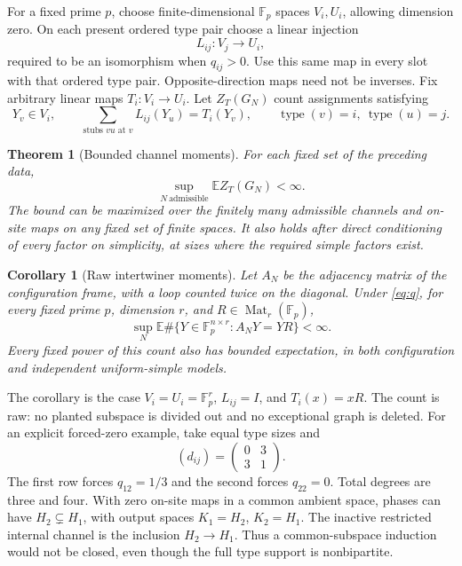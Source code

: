 \documentclass[11pt]{article}
\newtheorem{theorem}{Theorem}
\newtheorem{corollary}{Corollary}
\newcommand{\Fp}{\mathbb F_p}
\newcommand{\E}{\mathbb E}
\begin{document}
For a fixed prime $p$, choose finite-dimensional $\Fp$ spaces $V_i,U_i$, allowing dimension zero. On each present ordered type pair choose a linear injection
\[
 L_{ij}:V_j\longrightarrow U_i,
\]
required to be an isomorphism when $q_{ij}>0$. Use this same map in every slot with that ordered type pair. Opposite-direction maps need not be inverses. Fix arbitrary linear maps $T_i:V_i\to U_i$. Let $Z_T(G_N)$ count assignments satisfying
\begin{equation}\label{eq:system}
 Y_v\in V_i,\qquad
 \sum_{\text{stubs }vu\text{ at }v}L_{ij}(Y_u)=T_i(Y_v),
 \qquad \operatorname{type}(v)=i,\ \operatorname{type}(u)=j.
\end{equation}

\begin{theorem}[Bounded channel moments]\label{thm:main}
For each fixed set of the preceding data,
\[
 \sup_{N\ \mathrm{admissible}}\E Z_T(G_N)<\infty.
\]
The bound can be maximized over the finitely many admissible channels and on-site maps on any fixed set of finite spaces. It also holds after direct conditioning of every factor on simplicity, at sizes where the required simple factors exist.
\end{theorem}

\begin{corollary}[Raw intertwiner moments]\label{cor:intertwiner}
Let $A_N$ be the adjacency matrix of the configuration frame, with a loop counted twice on the diagonal. Under \eqref{eq:q}, for every fixed prime $p$, dimension $r$, and $R\in\operatorname{Mat}_r(\Fp)$,
\[
 \sup_N\E\#\{Y\in\Fp^{n\times r}:A_NY=YR\}<\infty.
\]
Every fixed power of this count also has bounded expectation, in both configuration and independent uniform-simple models.
\end{corollary}

The corollary is the case $V_i=U_i=\Fp^r$, $L_{ij}=I$, and $T_i(x)=xR$. The count is raw: no planted subspace is divided out and no exceptional graph is deleted. For an explicit forced-zero example, take equal type sizes and
\begin{equation}\label{eq:example}
 (d_{ij})=\begin{pmatrix}0&3\\3&1\end{pmatrix}.
\end{equation}
The first row forces $q_{12}=1/3$ and the second forces $q_{22}=0$. Total degrees are three and four. With zero on-site maps in a common ambient space, phases can have $H_2\subsetneq H_1$, with output spaces $K_1=H_2$, $K_2=H_1$. The inactive restricted internal channel is the inclusion $H_2\to H_1$. Thus a common-subspace induction would not be closed, even though the full type support is nonbipartite.
\end{document}
